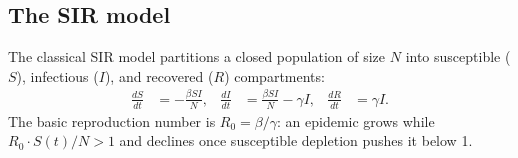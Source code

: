 \subsection{The SIR model}
The classical SIR model partitions a closed population of size $N$ into susceptible ($S$),
infectious ($I$), and recovered ($R$) compartments:
\begin{align}
  \frac{dS}{dt} &= -\frac{\beta S I}{N}, &
  \frac{dI}{dt} &= \frac{\beta S I}{N} - \gamma I, &
  \frac{dR}{dt} &= \gamma I. \label{eq:sir}
\end{align}
The basic reproduction number is $R_0 = \beta/\gamma$: an epidemic grows while $R_0 \cdot S(t)/N > 1$
and declines once susceptible depletion pushes it below 1.
